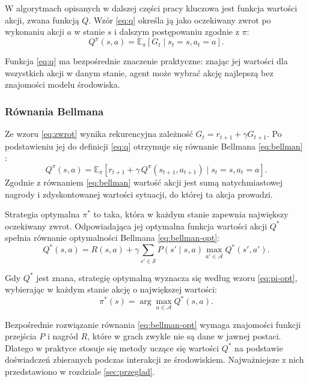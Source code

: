 W algorytmach opisanych w dalszej części pracy kluczowa jest funkcja wartości akcji, zwana funkcją $Q$. Wzór \eqref{eq:q} określa ją jako oczekiwany zwrot po wykonaniu akcji $a$ w stanie $s$ i dalszym postępowaniu zgodnie z $\pi$:
\begin{equation}
	Q^{\pi}(s, a) = \mathbb{E}_{\pi}\left[ G_t \mid s_t = s, a_t = a \right].
	\label{eq:q}
\end{equation}

Funkcja \eqref{eq:q} ma bezpośrednie znaczenie praktyczne: znając jej wartości dla wszystkich akcji w danym stanie, agent może wybrać akcję najlepszą bez znajomości modelu środowiska.

\subsubsection{Równania Bellmana}

Ze wzoru \eqref{eq:zwrot} wynika rekurencyjna zależność $G_t = r_{t+1} + \gamma G_{t+1}$. Po podstawieniu jej do definicji \eqref{eq:q} otrzymuje się równanie Bellmana \eqref{eq:bellman} \cite{sutton2018}:
\begin{equation}
	Q^{\pi}(s, a) = \mathbb{E}_{\pi}\left[ r_{t+1} + \gamma\, Q^{\pi}(s_{t+1}, a_{t+1}) \mid s_t = s, a_t = a \right].
	\label{eq:bellman}
\end{equation}
Zgodnie z równaniem \eqref{eq:bellman} wartość akcji jest sumą natychmiastowej nagrody i zdyskontowanej wartości sytuacji, do której ta akcja prowadzi.

Strategia optymalna $\pi^*$ to taka, która w każdym stanie zapewnia największy oczekiwany zwrot. Odpowiadająca jej optymalna funkcja wartości akcji $Q^*$ spełnia równanie optymalności Bellmana \eqref{eq:bellman-opt}:
\begin{equation}
	Q^{*}(s, a) = R(s, a) + \gamma \sum_{s' \in \mathcal{S}} P(s' \mid s, a) \max_{a' \in \mathcal{A}} Q^{*}(s', a').
	\label{eq:bellman-opt}
\end{equation}

Gdy $Q^*$ jest znana, strategię optymalną wyznacza się według wzoru \eqref{eq:pi-opt}, wybierając w każdym stanie akcję o największej wartości:
\begin{equation}
	\pi^{*}(s) = \arg\max_{a \in \mathcal{A}} Q^{*}(s, a).
	\label{eq:pi-opt}
\end{equation}

Bezpośrednie rozwiązanie równania \eqref{eq:bellman-opt} wymaga znajomości funkcji przejścia $P$ i nagród $R$, które w grach zwykle nie są dane w jawnej postaci. Dlatego w praktyce stosuje się metody uczące się wartości $Q^*$ na podstawie doświadczeń zbieranych podczas interakcji ze środowiskiem. Najważniejsze z nich przedstawiono w rozdziale \ref{sec:przeglad}.

